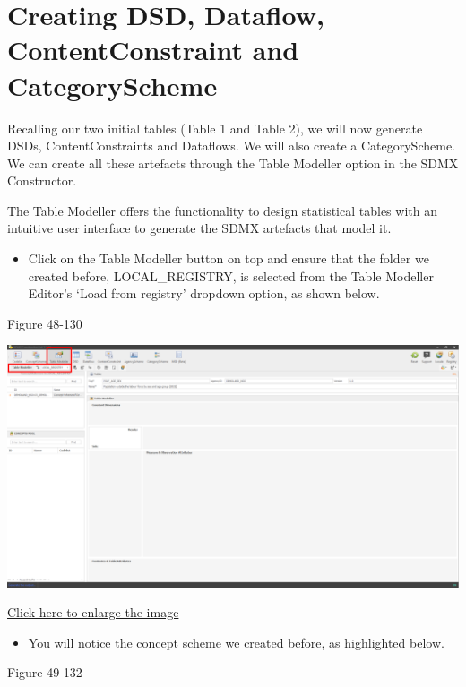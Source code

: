 \documentclass[
]{book}
\providecommand{\tightlist}{%
  \setlength{\itemsep}{0pt}\setlength{\parskip}{0pt}}
\theoremstyle{definition}
\theoremstyle{definition}
\theoremstyle{definition}
\theoremstyle{definition}
\theoremstyle{remark}
\begin{document}
\hypertarget{creating-dsd}{%
\section{Creating DSD, Dataflow, ContentConstraint and CategoryScheme}\label{creating-dsd}}

Recalling our two initial tables (Table 1 and Table 2), we will now generate DSDs, ContentConstraints and Dataflows. We will also create a CategoryScheme. We can create all these artefacts through the Table Modeller option in the SDMX Constructor.

The Table Modeller offers the functionality to design statistical tables with an intuitive user interface to generate the SDMX artefacts that model it.

\begin{itemize}
\tightlist
\item
  Click on the Table Modeller button on top and ensure that the folder we created before, LOCAL\_REGISTRY, is selected from the Table Modeller Editor's `Load from registry' dropdown option, as shown below.
\end{itemize}

Figure 48-130

\begin{center}\includegraphics[width=1\linewidth]{./images/image130} \end{center}

\href{images/image130.png}{Click here to enlarge the image}

\begin{itemize}
\tightlist
\item
  You will notice the concept scheme we created before, as highlighted below.
\end{itemize}

Figure 49-132
\end{document}
